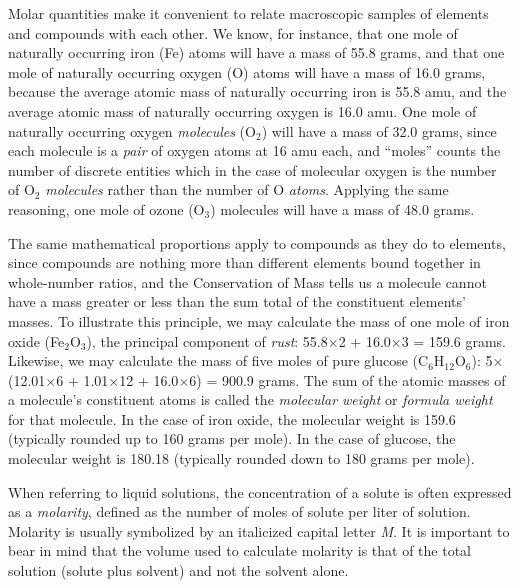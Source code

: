 Molar quantities make it convenient to relate macroscopic samples of elements and compounds with each other.  We know, for instance, that one mole of naturally occurring iron (Fe) atoms will have a mass of 55.8 grams, and that one mole of naturally occurring oxygen (O) atoms will have a mass of 16.0 grams, because the average atomic mass of naturally occurring iron is 55.8 amu, and the average atomic mass of naturally occurring oxygen is 16.0 amu.  One mole of naturally occurring oxygen \textit{molecules} (O$_{2}$) will have a mass of 32.0 grams, since each molecule is a \textit{pair} of oxygen atoms at 16 amu each, and ``moles'' counts the number of discrete entities which in the case of molecular oxygen is the number of O$_{2}$ \textit{molecules} rather than the number of O \textit{atoms}.  Applying the same reasoning, one mole of ozone (O$_{3}$) molecules will have a mass of 48.0 grams.

The same mathematical proportions apply to compounds as they do to elements, since compounds are nothing more than different elements bound together in whole-number ratios, and the Conservation of Mass tells us a molecule cannot have a mass greater or less than the sum total of the constituent elements' masses.  To illustrate this principle, we may calculate the mass of one mole of iron oxide (Fe$_{2}$O$_{3}$), the principal component of \textit{rust}: 55.8$\times$2 + 16.0$\times$3 = 159.6 grams.  Likewise, we may calculate the mass of five moles of pure glucose (C$_{6}$H$_{12}$O$_{6}$): 5$\times$(12.01$\times$6 + 1.01$\times$12 + 16.0$\times$6) = 900.9 grams.  The sum of the atomic masses of a molecule's constituent atoms is called the \textit{molecular weight} or \textit{formula weight} for that molecule.  In the case of iron oxide, the molecular weight is 159.6 (typically rounded up to 160 grams per mole).  In the case of glucose, the molecular weight is 180.18 (typically rounded down to 180 grams per mole).    

\vskip 10pt

\filbreak

When referring to liquid solutions, the concentration of a solute is often expressed as a \textit{molarity}, defined as the number of moles of solute per liter of solution.  Molarity is usually symbolized by an italicized capital letter \textit{M}.  It is important to bear in mind that the volume used to calculate molarity is that of the total solution (solute plus solvent) and not the solvent alone.  

